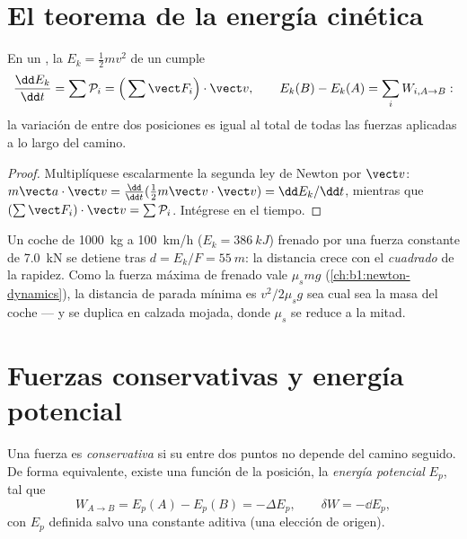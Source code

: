 \section{El teorema de la energía cinética}

\begin{theorem}\label{thm:b1:work-and-energy:ke}
En un , la \emph{} $E_k = \tfrac12 mv^2$
de un  cumple
\[
\frac{\dd E_k}{\dd t} = \sum\mathcal P_i = \Big(\sum\vect F_i\Big)\cdot\vect v,
\qquad
E_k(B) - E_k(A) = \sum_i W_{i,A\to B}:
\]
la variación de  entre dos posiciones es igual al 
total de todas las fuerzas aplicadas a lo largo del camino.
\end{theorem}

\begin{proof}
Multiplíquese escalarmente la segunda ley de Newton por $\vect v$: $m\vect a\cdot\vect v =
\tfrac{\dd}{\dd t}(\tfrac12 m\vect v\cdot\vect v) = \dd E_k/\dd t$, mientras que
$(\sum\vect F_i)\cdot\vect v = \sum\mathcal P_i$. Intégrese en el tiempo.
\end{proof}

\begin{example}\label{ex:b1:work-and-energy:braking}
Un coche de \qty{1000}{kg} a \qty{100}{km/h} ($E_k = \qty{386}{kJ}$)
frenado por una fuerza constante de \qty{7.0}{kN} se detiene tras
$d = E_k/F = \qty{55}{m}$: la distancia crece con el \emph{cuadrado} de la
rapidez. Como la fuerza máxima de frenado vale $\mu_smg$
(\cref{ch:b1:newton-dynamics}), la distancia de parada mínima es
$v^2/2\mu_sg$ sea cual sea la masa del coche --- y se duplica en calzada
mojada, donde $\mu_s$ se reduce a la mitad.
\end{example}

\section{Fuerzas conservativas y energía potencial}

\begin{definition}\label{def:b1:work-and-energy:conservative}
Una fuerza es \emph{conservativa} si su  entre dos puntos no
depende del camino seguido. De forma equivalente, existe una función de
la posición, la \emph{energía potencial} $E_p$, tal que
\[
W_{A\to B} = E_p(A) - E_p(B) = -\Delta E_p ,
\qquad \delta W = -\dd E_p ,
\]
con $E_p$ definida salvo una constante aditiva (una elección de origen).
\end{definition}

